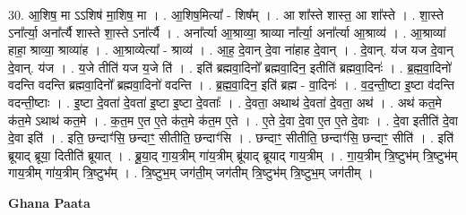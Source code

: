 \documentclass[17pt]{extarticle}
\begin{document}
30. आ॒शिष॒ मा ऽऽशिष॑ मा॒शिष॒ मा । . आ॒शिष॒मित्या᳚ - शिष᳚म् । . आ शा᳚स्ते शास्त॒ आ शा᳚स्ते । . शा॒स्ते ऽना᳚र्त्या॒ अना᳚र्त्यै शास्ते शा॒स्ते ऽना᳚र्त्यै । . अना᳚र्त्या आ॒श्राव्या॒ श्राव्या ना᳚र्त्या॒ अना᳚र्त्या आ॒श्राव्य॑ । . आ॒श्राव्या॑ हाहा॒ श्राव्या॒ श्राव्या॑ह । . आ॒श्राव्येत्या᳚ - श्राव्य॑ । . आ॒ह॒ दे॒वान् दे॒वा ना॑हाह दे॒वान् । . दे॒वान्. य॑ज यज दे॒वान् दे॒वान्. य॑ज । . य॒जे तीति॑ यज य॒जे ति॑ । . इति॑ ब्रह्मवा॒दिनो᳚ ब्रह्मवा॒दिन॒ इतीति॑ ब्रह्मवा॒दिनः॑ । . ब्र॒ह्म॒वा॒दिनो॑ वदन्ति वदन्ति ब्रह्मवा॒दिनो᳚ ब्रह्मवा॒दिनो॑ वदन्ति । . ब्र॒ह्म॒वा॒दिन॒ इति॑ ब्रह्म - वा॒दिनः॑ । . व॒द॒न्ती॒ष्टा इ॒ष्टा व॑दन्ति वदन्ती॒ष्टाः । . इ॒ष्टा दे॒वता॑ दे॒वता॑ इ॒ष्टा इ॒ष्टा दे॒वताः᳚ । . दे॒वता॒ अथाथ॑ दे॒वता॑ दे॒वता॒ अथ॑ । . अथ॑ कत॒मे क॑त॒मे ऽथाथ॑ कत॒मे । . क॒त॒म ए॒त ए॒ते क॑त॒मे क॑त॒म ए॒ते । . ए॒ते दे॒वा दे॒वा ए॒त ए॒ते दे॒वाः । . दे॒वा इतीति॑ दे॒वा दे॒वा इति॑ । . इति॒ छन्दाꣳ॑सि॒ छन्दाꣳ॒॒ सीतीति॒ छन्दाꣳ॑सि । . छन्दाꣳ॒॒ सीतीति॒ छन्दाꣳ॑सि॒ छन्दाꣳ॒॒ सीति॑ । . इति॑ ब्रूयाद् ब्रूया॒ दितीति॑ ब्रूयात् । . ब्रू॒या॒द् गा॒य॒त्रीम् गा॑य॒त्रीम् ब्रू॑याद् ब्रूयाद् गाय॒त्रीम् । . गा॒य॒त्रीम् त्रि॒ष्टुभ॑म् त्रि॒ष्टुभ॑म् गाय॒त्रीम् गा॑य॒त्रीम् त्रि॒ष्टुभ᳚म् । . त्रि॒ष्टुभ॒म् जग॑ती॒म् जग॑तीम् त्रि॒ष्टुभ॑म् त्रि॒ष्टुभ॒म् जग॑तीम् । \newline

\textbf{Ghana Paata } \newline
\end{document}
